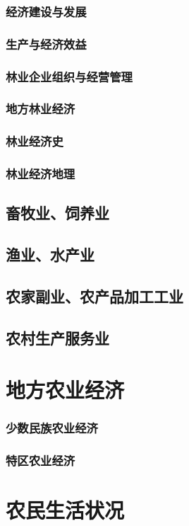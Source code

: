 \documentclass[UTF8]{../../RepresentationUniverse}
\begin{document}
        \subsubsection{经济建设与发展}
        \subsubsection{生产与经济效益}
        \subsubsection{林业企业组织与经营管理}
        \subsubsection{地方林业经济}
        \subsubsection{林业经济史}
        \subsubsection{林业经济地理}
    \subsection{畜牧业、饲养业}
    \subsection{渔业、水产业}
    \subsection{农家副业、农产品加工工业}
    \subsection{农村生产服务业}

\section{地方农业经济}
    \subsubsection{少数民族农业经济}
    \subsubsection{特区农业经济}
\section{农民生活状况}
\end{document}
